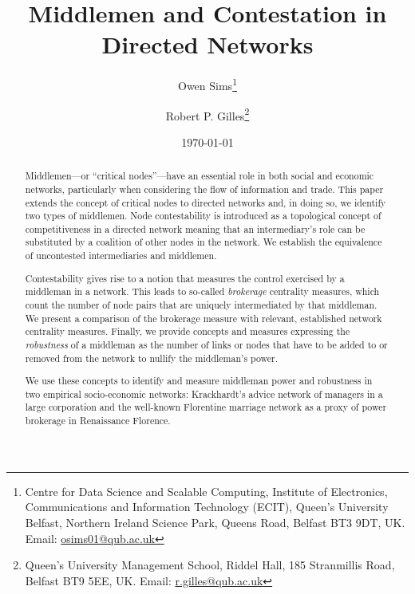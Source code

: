 \documentclass[11pt,fleqn]{article}
\begin{document}
\title{\textbf{Middlemen and Contestation in Directed Networks}}
\author{Owen Sims\footnote{Centre for Data Science and Scalable Computing, Institute of Electronics, Communications and Information Technology (ECIT), Queen's University Belfast, Northern Ireland Science Park, Queens Road, Belfast BT3 9DT, UK. Email: \href{osims01@qub.ac.uk}{osims01@qub.ac.uk}} 
\and Robert P. Gilles\footnote{Queen's University Management School, Riddel Hall, 185 Stranmillis Road, Belfast BT9 5EE, UK. Email: \href{r.gilles@qub.ac.uk}{r.gilles@qub.ac.uk}}
}
\date{\today}
\maketitle

\begin{abstract}
\singlespace\noindent
Middlemen---or ``critical nodes''---have an essential role in both social and economic networks, particularly when considering the flow of information and trade. This paper extends the concept of critical nodes to directed networks and, in doing so, we identify two types of middlemen. Node contestability is introduced as a topological concept of competitiveness in a directed network meaning that an intermediary's role can be substituted by a coalition of other nodes in the network. We establish the equivalence of uncontested intermediaries and middlemen.

Contestability gives rise to a notion that measures the control exercised by a middleman in a network. This leads to so-called \emph{brokerage} centrality measures, which count the number of node pairs that are uniquely intermediated by that middleman. We present a comparison of the brokerage measure with relevant, established network centrality measures. Finally, we provide concepts and measures expressing the \emph{robustness} of a middleman as the number of links or nodes that have to be added to or removed from the network to nullify the middleman's power.

We use these concepts to identify and measure middleman power and robustness in two empirical socio-economic networks: Krackhardt's advice network of managers in a large corporation and the well-known Florentine marriage network as a proxy of power brokerage in Renaissance Florence.
\end{abstract}

\thispagestyle{empty}

\newpage

\setcounter{page}{1} 
\end{document}
